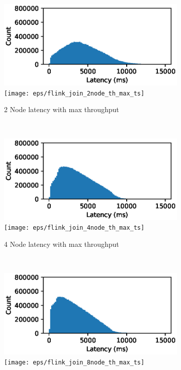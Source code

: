 \begin{figure}
   \centering
   \begin{subfigure}[b]{0.3\textwidth}
       \includegraphics[width=\textwidth]{eps/flink_join_2node_th_max_hist}
        \texttt{[image: eps/flink\_join\_2node\_th\_max\_ts]}

       \caption{2 Node latency with max throughput}
   \end{subfigure}
   ~ 
   \begin{subfigure}[b]{0.3\textwidth}
       \includegraphics[width=\textwidth]{eps/flink_join_4node_th_max_hist}
        \texttt{[image: eps/flink\_join\_4node\_th\_max\_ts]}

       \caption{4 Node latency with max throughput }
   \end{subfigure}
   ~ 
   \begin{subfigure}[b]{0.3\textwidth}
       \includegraphics[width=\textwidth]{eps/flink_join_8node_th_max_hist}
        \texttt{[image: eps/flink\_join\_8node\_th\_max\_ts]}


\end{subfigure}
\end{figure}
